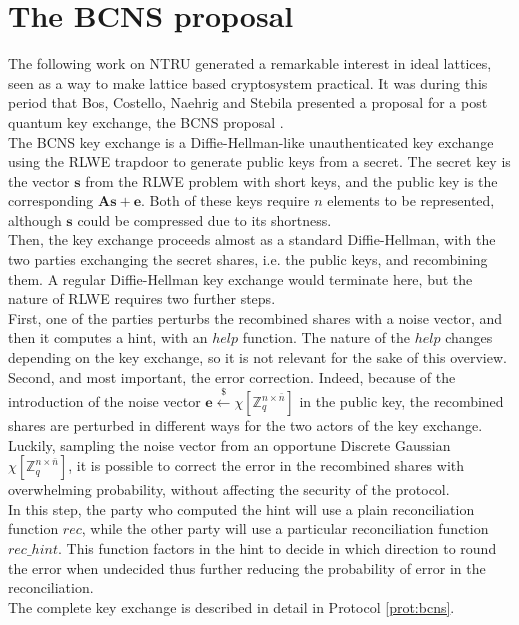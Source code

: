 \section{The BCNS proposal}
The following work on NTRU generated a remarkable interest in ideal lattices, seen as a way to make lattice based cryptosystem practical. It was during this period that Bos, Costello, Naehrig and Stebila presented a proposal for a post quantum key exchange, the BCNS proposal \cite{BCNS}.\\
The BCNS key exchange is a Diffie-Hellman-like unauthenticated key exchange using the RLWE trapdoor to generate public keys from a secret. The secret key is the vector $\mathbf{s}$ from the RLWE problem with short keys, and the public key is the corresponding $\mathbf{A}\mathbf{s}+\mathbf{e}$. Both of these keys require $n$ elements to be represented, although $\mathbf{s}$ could be compressed due to its shortness.\\
Then, the key exchange proceeds almost as a standard Diffie-Hellman, with the two parties exchanging the secret shares, i.e. the public keys, and recombining them. A regular Diffie-Hellman key exchange would terminate here, but the nature of RLWE requires two further steps.\\
First, one of the parties perturbs the recombined shares with a noise vector, and then it computes a hint, with an $help$ function. The nature of the $help$ changes depending on the key exchange, so it is not relevant for the sake of this overview. Second, and most important, the error correction. Indeed, because of the introduction of the noise vector $\mathbf{e}\xleftarrow{\$}\chi[\mathbb{Z}^{n\times\bar{n}}_q]$ in the public key, the recombined shares are perturbed in different ways for the two actors of the key exchange. Luckily, sampling the noise vector from an opportune Discrete Gaussian $\chi[\mathbb{Z}^{n\times\bar{n}}_q]$, it is possible to correct the error in the recombined shares with overwhelming probability, without affecting the security of the protocol.\\
In this step, the party who computed the hint will use a plain reconciliation function $rec$, while the other party will use a particular reconciliation function $rec\_hint$. This function factors in the hint to decide in which direction to round the error when undecided thus further reducing the probability of error in the reconciliation. \\
The complete key exchange is described in detail in Protocol \ref{prot:bcns}.\\
